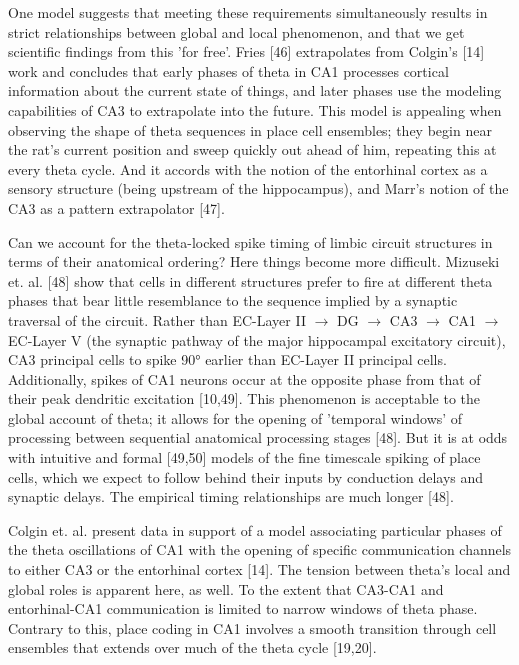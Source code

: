 \documentclass[]{article}
\begin{document}
One model suggests that meeting these requirements simultaneously
results in strict relationships between global and local phenomenon, and
that we get scientific findings from this 'for free'. Fries {[}46{]}
extrapolates from Colgin's {[}14{]} work and concludes that early phases
of theta in CA1 processes cortical information about the current state
of things, and later phases use the modeling capabilities of CA3 to
extrapolate into the future. This model is appealing when observing the
shape of theta sequences in place cell ensembles; they begin near the
rat's current position and sweep quickly out ahead of him, repeating
this at every theta cycle. And it accords with the notion of the
entorhinal cortex as a sensory structure (being upstream of the
hippocampus), and Marr's notion of the CA3 as a pattern extrapolator
{[}47{]}.

Can we account for the theta-locked spike timing of limbic circuit
structures in terms of their anatomical ordering? Here things become
more difficult. Mizuseki et. al. {[}48{]} show that cells in different
structures prefer to fire at different theta phases that bear little
resemblance to the sequence implied by a synaptic traversal of the
circuit. Rather than EC-Layer II \(\rightarrow\) DG \(\rightarrow\) CA3
\(\rightarrow\) CA1 \(\rightarrow\) EC-Layer V (the synaptic pathway of
the major hippocampal excitatory circuit), CA3 principal cells to spike
90° earlier than EC-Layer II principal cells. Additionally, spikes of
CA1 neurons occur at the opposite phase from that of their peak
dendritic excitation {[}10,49{]}. This phenomenon is acceptable to the
global account of theta; it allows for the opening of 'temporal windows'
of processing between sequential anatomical processing stages {[}48{]}.
But it is at odds with intuitive and formal {[}49,50{]} models of the
fine timescale spiking of place cells, which we expect to follow behind
their inputs by conduction delays and synaptic delays. The empirical
timing relationships are much longer {[}48{]}.

Colgin et. al. present data in support of a model associating particular
phases of the theta oscillations of CA1 with the opening of specific
communication channels to either CA3 or the entorhinal cortex {[}14{]}.
The tension between theta's local and global roles is apparent here, as
well. To the extent that CA3-CA1 and entorhinal-CA1 communication is
limited to narrow windows of theta phase. Contrary to this, place coding
in CA1 involves a smooth transition through cell ensembles that extends
over much of the theta cycle {[}19,20{]}.
\end{document}
